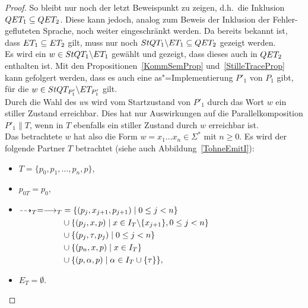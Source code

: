 \begin{proof}
  So bleibt nur noch der letzt Beweispunkt zu zeigen, d.h.\ die Inklusion $QET
  _1\subseteq QET _2$. Diese kann jedoch, analog zum Beweis der Inklusion der
  Fehler-gefluteten Sprache, noch weiter eingeschränkt werden. Da bereits
  bekannt ist, dass $ET _1\subseteq ET _2$ gilt, muss nur noch $StQT
  _1\backslash ET _1\subseteq QET _2$ gezeigt werden.\\
  Es wird ein $w\in StQT _1\backslash ET _1$ gewählt und gezeigt, dass dieses
  auch in $QET _2$ enthalten ist. Mit den Propositionen~\ref{KommSemProp}
  und~\ref{StilleTraceProp} kann gefolgert werden, dass es auch eine
  as"=Implementierung $P'_1$ von $P_1$ gibt, für die $w\in StQT _{P'_1}
  \backslash ET _{P'_1}$ gilt.\\
  Durch die Wahl des $w$s wird vom Startzustand von $P'_1$ durch das Wort $w$
  ein stiller Zustand erreichbar. Dies hat nur Auswirkungen auf die
  Parallelkomposition $P'_1\|T$, wenn in $T$ ebenfalls ein stiller Zustand
  durch $w$ erreichbar ist.\\
  Das betrachtete $w$ hat also die Form $w=x_1\dots x_n\in\Sigma ^*$ mit $n\geq
  0$. Es wird der folgende Partner $T$ betrachtet (siehe auch
  Abbildung~\ref{TohneEmitI}):
  \begin{itemize}
    \item $T=\{p_0,p_1,\dots ,p_n, p\}$,
    \item $p_{0T}=p_0$,
    \item $\begin{aligned}[t]
        \may _T = \must _T&=\{(p_j,x_{j+1},p_{j+1})\mid  0\leq j< n\}\\
        &\cup\{(p_j,x,p)\mid  x\in I_T\backslash\{x_{j+1}\}, 0\leq j< n\}\\
        &\cup\{(p_j,\tau,p_j)\mid 0\leq j< n\}\\
        &\cup\{(p_n,x,p)\mid x\in I_T\}\\
        &\cup\{(p,\alpha,p)\mid \alpha\in I_T\cup\{\tau\}\},
    \end{aligned}$
    \item $E_T=\emptyset$.
  \end{itemize}
  \begin{figure} [h!tbp]
  \begin{center}
\end{center}
\end{figure}
\end{proof}
